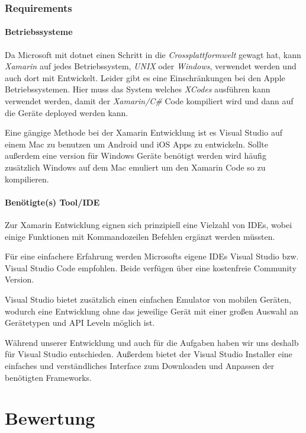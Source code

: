 \documentclass[12pt]{article}
\begin{document}
\subsubsection{Requirements}
\paragraph{Betriebssysteme}
Da Microsoft mit dotnet einen Schritt in die \textit{Crossplattformwelt} gewagt hat, kann \textit{Xamarin} auf jedes Betriebssystem, \textit{UNIX} oder \textit{Windows}, verwendet werden und auch dort mit Entwickelt. Leider gibt es eine Einschränkungen bei den Apple Betriebssystemen. Hier muss das System welches \textit{XCodes} ausführen kann verwendet werden, damit der \textit{Xamarin/C\#} Code kompiliert wird und dann auf die Geräte deployed werden kann.

Eine gängige Methode bei der Xamarin Entwicklung ist es Visual Studio auf einem Mac zu benutzen um Android und iOS Apps zu entwickeln. Sollte außerdem eine version für Windows Geräte benötigt werden wird häufig zusätzlich Windows auf dem Mac emuliert um den Xamarin Code so zu kompilieren.

\paragraph{Benötigte(s) Tool/IDE}
Zur Xamarin Entwicklung eignen sich prinzipiell eine Vielzahl von IDEs, wobei einige Funktionen mit Kommandozeilen Befehlen ergänzt werden müssten.

Für eine einfachere Erfahrung werden Microsofts eigene IDEs Visual Studio bzw. Visual Studio Code empfohlen. Beide verfügen über eine kostenfreie Community Version.

Visual Studio bietet zusätzlich einen einfachen Emulator von mobilen Geräten, wodurch eine Entwicklung ohne das jeweilige Gerät mit einer großen Auswahl an Gerätetypen und API Leveln möglich ist.

Während unserer Entwicklung  und auch für die Aufgaben haben wir uns  deshalb für Visual Studio entschieden. Außerdem bietet der Visual Studio Installer eine einfaches und verständliches Interface zum Downloaden und Anpassen der benötigten Frameworks.



\section{Bewertung}
\end{document}
